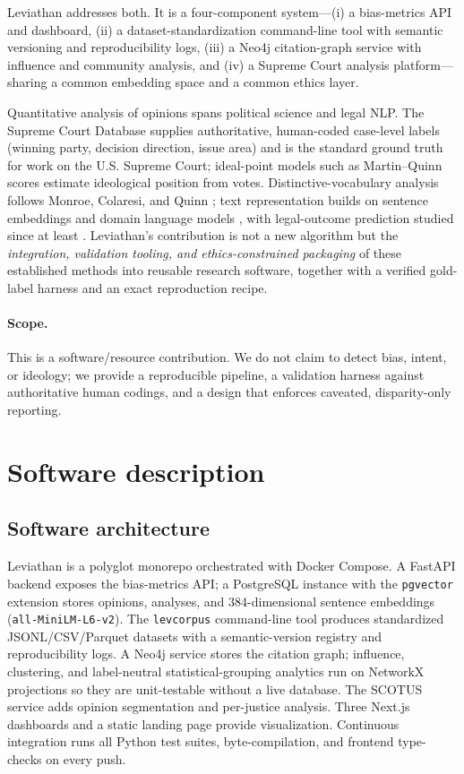 \documentclass[preprint,12pt]{elsarticle}
\begin{document}
Leviathan addresses both. It is a four-component system---(i) a bias-metrics API and dashboard,
(ii) a dataset-standardization command-line tool with semantic versioning and reproducibility logs,
(iii) a Neo4j citation-graph service with influence and community analysis, and (iv) a Supreme Court
analysis platform---sharing a common embedding space and a common ethics layer.

Quantitative analysis of opinions spans political science and legal NLP. The Supreme Court Database
\cite{spaeth2023scdb} supplies authoritative, human-coded case-level labels (winning party, decision
direction, issue area) and is the standard ground truth for work on the U.S. Supreme Court;
ideal-point models such as Martin--Quinn scores \cite{martin2002dynamic} estimate ideological
position from votes. Distinctive-vocabulary analysis follows Monroe, Colaresi, and Quinn
\cite{monroe2008fightin}; text representation builds on sentence embeddings
\cite{reimers2019sentencebert} and domain language models \cite{chalkidis2020legalbert}, with
legal-outcome prediction studied since at least \cite{aletras2016predicting}. Leviathan's
contribution is not a new algorithm but the \emph{integration, validation tooling, and
ethics-constrained packaging} of these established methods into reusable research software, together
with a verified gold-label harness and an exact reproduction recipe.

\paragraph{Scope.} This is a software/resource contribution. We do not claim to detect bias, intent,
or ideology; we provide a reproducible pipeline, a validation harness against authoritative human
codings, and a design that enforces caveated, disparity-only reporting.

\section{Software description}

\subsection{Software architecture}
Leviathan is a polyglot monorepo orchestrated with Docker Compose. A FastAPI backend exposes the
bias-metrics API; a PostgreSQL instance with the \texttt{pgvector} extension stores opinions,
analyses, and 384-dimensional sentence embeddings (\texttt{all-MiniLM-L6-v2}). The \texttt{levcorpus}
command-line tool produces standardized JSONL/CSV/Parquet datasets with a semantic-version registry
and reproducibility logs. A Neo4j service stores the citation graph; influence, clustering, and
label-neutral statistical-grouping analytics run on NetworkX projections so they are unit-testable
without a live database. The SCOTUS service adds opinion segmentation and per-justice analysis. Three
Next.js dashboards and a static landing page provide visualization. Continuous integration runs all
Python test suites, byte-compilation, and frontend type-checks on every push.
\end{document}
